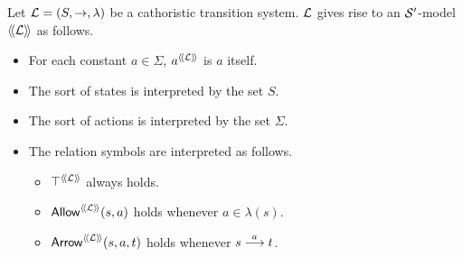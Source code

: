 \begin{definition}
Let $\mathcal{L} = (S, \rightarrow, \lambda)$ be a cathoristic transition
system. $\mathcal{L}$ gives rise to an $\mathcal{S}'$-model $\langle\!\langle \mathcal{L} \rangle\!\rangle$
as follows.
\begin{itemize}

\item For each constant $a \in \Sigma$, $a^{\langle\!\langle \mathcal{L} \rangle\!\rangle}$ is $a$ itself.

\item The sort of states is interpreted by the set $S$.

\item The sort of actions is interpreted by the set $\Sigma$.

\item The relation symbols are interpreted as follows.

  \begin{itemize}

    \item $\top^{\langle\!\langle \mathcal{L} \rangle\!\rangle}$ always holds.

    \item $\mathsf{Allow}^{\langle\!\langle \mathcal{L} \rangle\!\rangle}(s, a)$ holds whenever $a \in \lambda(s)$.

    \item $\mathsf{Arrow}^{\langle\!\langle \mathcal{L} \rangle\!\rangle}(s, a, t)$ holds whenever $s \stackrel{a}{\longrightarrow} t$.

  \end{itemize}
\end{itemize}
\end{definition}


